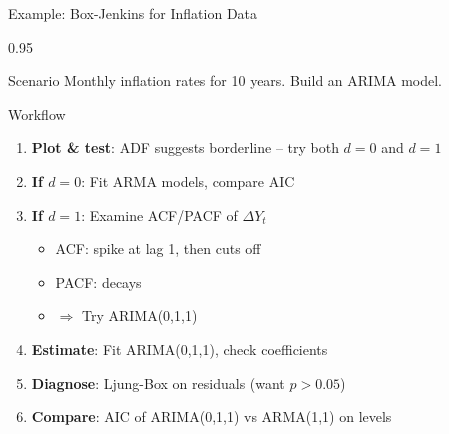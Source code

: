 \documentclass[9pt, aspectratio=169, t]{beamer}
\begin{document}
\begin{frame}{Example: Box-Jenkins for Inflation Data}
    \begin{cminipage}{0.95\textwidth}
    \begin{block}{Scenario}
        Monthly inflation rates for 10 years. Build an ARIMA model.
    \end{block}

    \begin{exampleblock}{Workflow}
        \begin{enumerate}
            \item \textbf{Plot \& test}: ADF suggests borderline -- try both $d=0$ and $d=1$
            \item \textbf{If $d=0$}: Fit ARMA models, compare AIC
            \item \textbf{If $d=1$}: Examine ACF/PACF of $\Delta Y_t$
                \begin{itemize}\setlength{\itemsep}{0pt}
                    \item ACF: spike at lag 1, then cuts off
                    \item PACF: decays
                    \item $\Rightarrow$ Try ARIMA(0,1,1)
                \end{itemize}
            \item \textbf{Estimate}: Fit ARIMA(0,1,1), check coefficients
            \item \textbf{Diagnose}: Ljung-Box on residuals (want $p > 0.05$)
            \item \textbf{Compare}: AIC of ARIMA(0,1,1) vs ARMA(1,1) on levels
        \end{enumerate}
    \end{exampleblock}
    \end{cminipage}
\end{frame}
\end{document}
